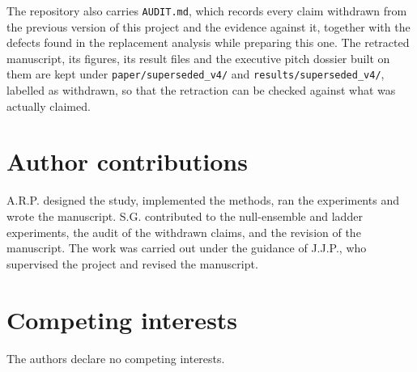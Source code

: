 \documentclass[10pt,twocolumn,letterpaper]{article}
\begin{document}
The repository also carries \texttt{AUDIT.md}, which records every claim withdrawn from
the previous version of this project and the evidence against it, together with the
defects found in the replacement analysis while preparing this one. The retracted
manuscript, its figures, its result files and the executive pitch dossier built on them
are kept under \texttt{paper/superseded\_v4/} and \texttt{results/superseded\_v4/},
labelled as withdrawn, so that the retraction can be checked against what was actually
claimed.

\section*{Author contributions}
A.R.P. designed the study, implemented the methods, ran the experiments and wrote the
manuscript. S.G. contributed to the null-ensemble and ladder experiments, the audit of
the withdrawn claims, and the revision of the manuscript. The work was carried out under
the guidance of J.J.P., who supervised the project and revised the manuscript.

\section*{Competing interests}
The authors declare no competing interests.



\end{document}
